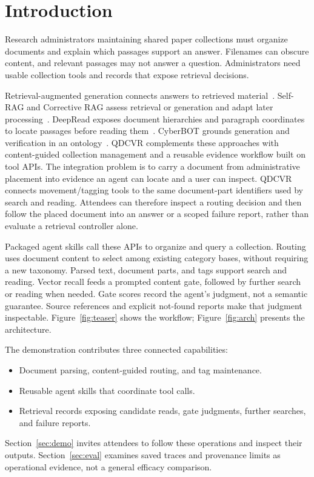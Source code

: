 \section{Introduction}

Research administrators maintaining shared paper collections must organize
documents and explain which passages support an answer. Filenames can obscure
content, and relevant passages may not answer a question. Administrators need
usable collection tools and records that expose retrieval decisions.

Retrieval-augmented generation connects answers to retrieved
material~\cite{rag-lewis}. Self-RAG and Corrective RAG assess retrieval or
generation and adapt later processing~\cite{selfrag,crag}.
DeepRead exposes document hierarchies and paragraph coordinates to locate
passages before reading them~\cite{deepread}. CyberBOT grounds generation and
verification in an ontology~\cite{cyberbot}. QDCVR complements these approaches
with content-guided collection management and a reusable evidence workflow
built on tool APIs. The integration problem is to carry a document
from administrative placement into evidence an agent can locate and a user
can inspect. QDCVR connects movement/tagging tools to the same document-part
identifiers used by search and reading. Attendees can therefore inspect a
routing decision and then follow the placed document into an answer or a
scoped failure report, rather than evaluate a retrieval controller alone.

Packaged agent skills call these APIs to organize and query a collection.
Routing uses document content to select among existing category bases, without
requiring a new taxonomy. Parsed text, document parts, and tags support search
and reading. Vector recall feeds a prompted content gate, followed by further
search or reading when needed. Gate scores record the agent's judgment, not a
semantic guarantee. Source references and explicit not-found reports make
that judgment inspectable. Figure~\ref{fig:teaser} shows the workflow;
Figure~\ref{fig:arch} presents the architecture.

The demonstration contributes three connected capabilities:
\begin{itemize}
  \item Document parsing, content-guided routing, and tag maintenance.
  \item Reusable agent skills that coordinate tool calls.
  \item Retrieval records exposing candidate reads, gate judgments, further
  searches, and failure reports.
\end{itemize}
Section~\ref{sec:demo} invites attendees to follow these operations and inspect
their outputs. Section~\ref{sec:eval} examines saved traces and provenance
limits as operational evidence, not a general efficacy comparison.

